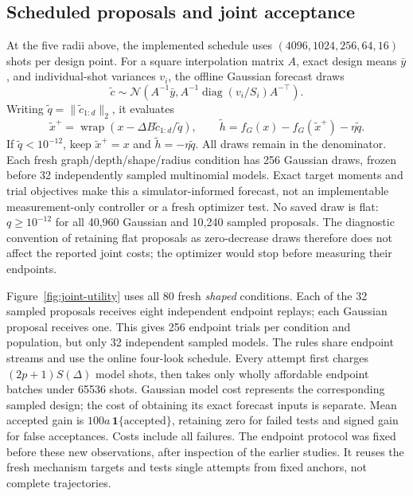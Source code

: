 \documentclass[11pt]{article}
\newcommand{\diag}{\operatorname{diag}}
\newcommand{\norm}[1]{\lVert #1\rVert}
\begin{document}
\subsection{Scheduled proposals and joint acceptance}
\label{sec:joint-protocol}
At the five radii above, the implemented schedule uses
$(4096,1024,256,64,16)$ shots per design point. For a square interpolation
matrix $A$, exact design means $\bar y$, and individual-shot variances
$v_i$, the offline Gaussian forecast draws
\begin{equation}
 \widetilde c\sim\mathcal N\!\left(A^{-1}\bar y,
 A^{-1}\diag(v_i/S_i)A^{-\top}\right).
 \label{eq:gaussiancoefficients}
\end{equation}
Writing $\widetilde q=\norm{\widetilde c_{1:d}}_2$, it evaluates
\begin{equation}
 \widetilde x^+=\operatorname{wrap}
 (x-\Delta B\widetilde c_{1:d}/\widetilde q),\qquad
 \widetilde h=f_G(x)-f_G(\widetilde x^+)-\eta\widetilde q.
 \label{eq:gaussianproposal}
\end{equation}
If $\widetilde q<10^{-12}$, keep $\widetilde x^+=x$ and
$\widetilde h=-\eta\widetilde q$. All draws remain in the denominator.
Each fresh graph/depth/shape/radius condition has 256 Gaussian draws,
frozen before 32 independently sampled multinomial models. Exact target
moments and trial objectives make this a simulator-informed forecast,
not an implementable measurement-only controller or a fresh optimizer test.
No saved draw is flat: $q\ge10^{-12}$ for all 40,960 Gaussian and 10,240
sampled proposals. The diagnostic convention of retaining flat proposals
as zero-decrease draws therefore does not affect the reported joint costs;
the optimizer would stop before measuring their endpoints.

Figure~\ref{fig:joint-utility} uses all 80 fresh \emph{shaped} conditions.
Each of the 32 sampled proposals receives eight independent endpoint
replays; each Gaussian proposal receives one. This gives 256 endpoint
trials per condition and population, but only 32 independent sampled
models. The rules share endpoint streams and use the online four-look
schedule. Every attempt first charges $(2p+1)S(\Delta)$ model shots,
then takes only wholly affordable endpoint batches under 65536 shots.
Gaussian model cost represents the corresponding sampled design; the cost
of obtaining its exact forecast inputs is separate. Mean accepted gain is
$100a\,\mathbf1\{\mathrm{accepted}\}$, retaining zero for failed tests and
signed gain for false acceptances. Costs include all failures. The endpoint
protocol was fixed before these new observations, after inspection of the
earlier studies. It reuses the fresh mechanism targets and tests single
attempts from fixed anchors, not complete trajectories.
\end{document}
